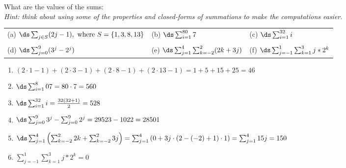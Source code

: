 \begin{questions}
 What are the values of the sums:\\
\textit{Hint: think about using some of the properties and closed-forms of summations to make the computations easier.} \\
\begin{tabular}{lll}
    (a) $\ds \sum_{j\in S} (2j - 1), \text{ where } S = \{1, 3, 8, 13\}$
    & (b) $\ds \sum_{i=1}^{80} 7$  \hspace*{1in} 
    & (c) $\ds \sum_{i=1}^{32} i$ \\
    & & \\
    (d) $\ds \sum_{j=0}^{9} (3^{j} - 2^{j})$
    & (e) $\ds \sum_{j=1}^{4} \sum_{k=-2}^{2} (2k + 3j)$
    & (f) $\ds \sum_{j=-1}^{1} \sum_{k=1}^{3} j*2^{k}$
\end{tabular}
    \ifprintanswers
        \vspace{-10pt}
   \fi
\begin{solution}
    \begin{enumerate}[label=(\alph*),itemsep=2pt,parsep=0pt,
    topsep=0pt,partopsep=0pt]
        \item $(2\cdot1 - 1)+(2\cdot3 - 1)+(2\cdot8 -1)+(2\cdot13-1) = 1+5+15+25 = 46$ 
        \item $\ds \sum_{i=1}^80 7 = 80\cdot7 = 560$
        \item $\ds \sum_{i=1}^{32} i = \frac{32(32+1)}{2}  = 528$
        \item $\ds \sum_{j=0}^9 3^{j} - \sum_{j=0}^9 2^{j} = 29523 -1022 = 28501$
        \item $\ds \sum_{j=1}^4 \left( \sum_{k=-2}^2 2k + \sum_{k=-2}^2 3j \right) = \sum_{j=1}^4 \left( 0 + 3j\cdot(2-(-2)+1)\cdot1 \right)  = \sum_{j=1}^4 15j = 150$
        \item $\sum_{j=-1}^1 \sum_{k=1}^3 j*2^k = 0$
    \end{enumerate}
\end{solution}




\end{questions}
